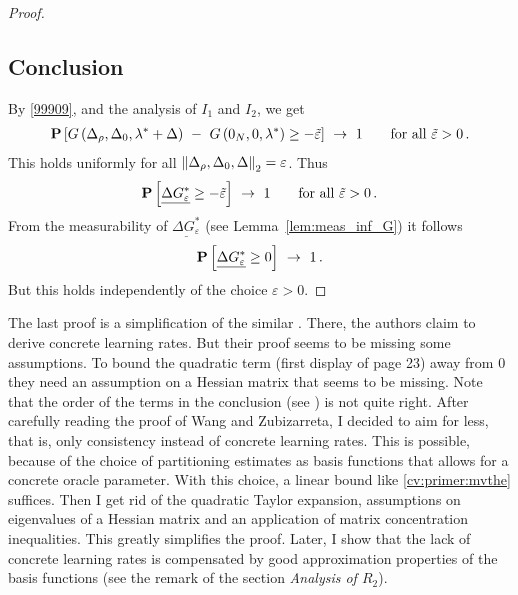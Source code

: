 \begin{proof}
\subsection*{Conclusion}
By \eqref{99909}, and the analysis of $I_1$ and $I_2$, we get
\begin{align*}
  \P
  \left[ 
   G
   \left( 
\Delta_\rho,\Delta_0,\lambda^*+\Delta
   \right)
   \ 
   -
   \ 
   G
   \left(
0_N,0,\lambda^*
   \right)
   \ge - 
  \tilde{\varepsilon}
  \right]
  \ 
  \to
  \ 
  1
  \qquad
  \text{for all}\ 
  \tilde{\varepsilon}>0
  \,.
\end{align*}
This holds uniformly for all 
$
\left\lVert
\Delta_\rho,\Delta_0,\Delta
\right\rVert_2=\varepsilon
$.
Thus
\begin{align*}
  \P
  \left[ 
  \underline{\Delta G^*_\varepsilon}
   \ge - 
  \tilde{\varepsilon}
  \right]
  \ 
  \to
  \ 
  1
  \qquad
  \text{for all}\ 
  \tilde{\varepsilon}>0
  \,.
\end{align*}
From the measurability of 
$
  \underline{\Delta G^*_\varepsilon}
$ 
(see Lemma~\ref{lem:meas_inf_G})
it follows
\begin{align*}
  \P
  \left[ 
  \underline{\Delta G^*_\varepsilon}
   \ge 0
  \right]
  \ 
  \to
  \ 
  1
  \,.
\end{align*}
But this holds independently of the choice $\varepsilon>0$.
 \end{proof}
\begin{remark}
  The last proof is a simplification of the similar \cite[Proof of Lemma~2]{Wang2019}. There, the authors claim to derive concrete learning rates. 
  But their proof seems to be missing some assumptions. To bound the quadratic term (first display of page 23) away from 0 they need an assumption on a Hessian matrix that seems to be missing.
  Note that the order of the terms in the conclusion (see \cite[page 25]{Wang2019}) is not quite right.
  After carefully reading the proof of Wang and Zubizarreta, I decided to aim for less, that is, only consistency instead of concrete learning rates.
  This is possible, because of the choice of partitioning estimates as basis functions that allows for a concrete oracle parameter.
  With this choice, a linear bound like \eqref{cv:primer:mvthe} suffices. Then I get rid of the quadratic Taylor expansion, assumptions on eigenvalues of a Hessian matrix and an application of matrix concentration inequalities. This greatly simplifies the proof.
  Later, I show that the lack of concrete learning rates is compensated by good approximation properties of the basis functions (see the remark of the section \textit{Analysis of $R_2$}).
\end{remark}
